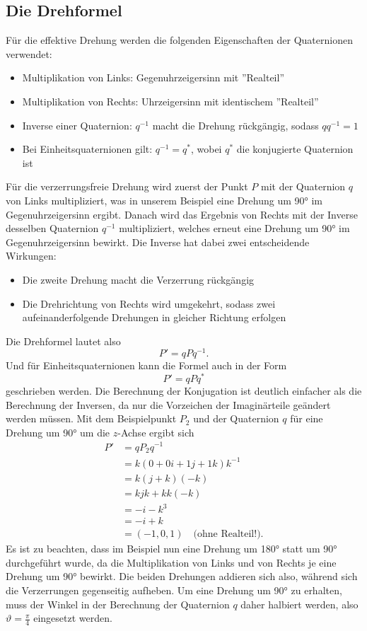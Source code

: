 \subsection{Die Drehformel\label{qa:section:drehungen:drehformel}}%
Für die effektive Drehung werden die folgenden Eigenschaften der 
Quaternionen verwendet:
\begin{itemize}
    \item Multiplikation von Links: Gegenuhrzeigersinn mit 
''Realteil''
    \item Multiplikation von Rechts: Uhrzeigersinn mit identischem ''Realteil''
    \item Inverse einer Quaternion: $q^{-1}$ macht die Drehung 
    rückgängig, sodass $q q^{-1} = 1$
    \item Bei Einheitsquaternionen gilt: $q^{-1} = q^*$, wobei $q^*$ 
    die konjugierte Quaternion ist
\end{itemize}
Für die verzerrungsfreie Drehung wird zuerst der Punkt $P$ mit der 
Quaternion $q$ von Links multipliziert, was in unserem Beispiel 
eine Drehung um 90° im Gegenuhrzeigersinn ergibt. Danach wird das 
Ergebnis von Rechts mit der Inverse desselben Quaternion $q^{-1}$ 
multipliziert, welches erneut eine Drehung um 90° im 
Gegenuhrzeigersinn bewirkt. Die Inverse hat dabei zwei 
entscheidende Wirkungen:
\begin{itemize}
    \item Die zweite Drehung macht die Verzerrung rückgängig
    \item Die Drehrichtung von Rechts wird umgekehrt, sodass zwei 
    aufeinanderfolgende Drehungen in gleicher Richtung erfolgen
\end{itemize}
Die Drehformel lautet also
\begin{equation*}
    P' = q P q^{-1}.
\end{equation*}
Und für Einheitsquaternionen kann die Formel auch in der Form
\begin{equation*}
    P' = q P q^*
\end{equation*}
geschrieben werden. Die Berechnung der Konjugation ist deutlich
einfacher als die Berechnung der Inversen, da nur die Vorzeichen
der Imaginärteile geändert werden müssen.
Mit dem Beispielpunkt $P_2$ und der Quaternion $q$ für eine Drehung
um 90° um die $z$-Achse ergibt sich
\begin{align*}
    P' &= q P_2 q^{-1} \\
    &= k (0 + 0i + 1\!j + 1k) k^{-1} \\
    &= k (j + k) (-k) \\
    &= k\!jk + kk(-k) \\
    &= -i - k^3 \\
    &= -i + k \\
    &= (-1, 0, 1) \quad \text{(ohne Realteil!)}.
\end{align*}
Es ist zu beachten, dass im Beispiel nun eine Drehung um 180° statt um 90° 
durchgeführt wurde, da die Multiplikation von Links und von Rechts je eine 
Drehung um 90° bewirkt. Die beiden Drehungen addieren sich also, während sich 
die Verzerrungen gegenseitig aufheben. Um eine Drehung um 90° zu erhalten, muss 
der Winkel in der Berechnung der Quaternion $q$ daher halbiert werden, also 
$\vartheta = \frac{\pi}{4}$ eingesetzt werden. 

